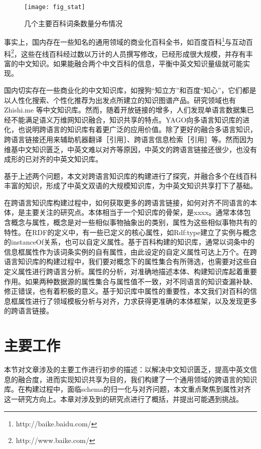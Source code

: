 \begin{figure}[H] %
  \centering
  \texttt{[image: fig\_stat]}
  \caption{几个主要百科词条数量分布情况}
  \label{fig:wiki-stat}
\end{figure}

事实上，国内存在一些知名的通用领域的商业化百科全书，如百度百科\footnote{http://baike.baidu.com/}与互动百科\footnote{http://www.baike.com/}，这些在线百科经过数以万计的人员撰写修改，已经形成很大规模，并存有丰富的中文知识。如果能融合两个中文百科的信息，平衡中英文知识量级就可能实现。

国内切实存在一些商业化的中文知识库，如搜狗“知立方”和百度“知心”，它们都是以人性化搜索、个性化推荐为出发点所建立的知识图谱产品。研究领域也有Zhishi.me\cite{niu2011zhishi} 等中文知识库。然而，随着开放链接的增多，人们发现单语言数据集已经不能满足语义万维网知识融合，知识共享的特点。YAGO向多语言知识库的进化，也说明跨语言的知识库有着更广泛的应用价值。除了更好的融合多语言知识，跨语言链接还用来辅助机器翻译［引用］、跨语言信息检索［引用］等。然而因为维基中文知识匮乏，中英文难以对齐等原因，中英文的跨语言链接还很少，也没有成形的已对齐的中英文知识库。

基于上述两个问题，本文对跨语言知识库的构建进行了探究，并融合多个在线百科丰富的知识，形成了中英文双语的大规模知识库，为中英文知识共享打下了基础。

在跨语言知识库构建过程中，如何获取更多的跨语言链接，如何对齐不同语言的本体，是主要关注的研究点。本体相当于一个知识库的骨架，是xxxx。通常本体包含概念与属性，概念是对一些相似事物抽象出的类别，属性为这些相似事物共有的特性。在RDF的定义中，有一些已定义的核心属性，如Rdf:type建立了实例与概念的instanceOf关系，也可以自定义属性。基于百科构建的知识库，通常以词条中的信息框属性作为该词条实例的自有属性，由此设定的自定义属性可达上万个。在跨语言知识库的构建过程中，我们要对概念下的属性集合有所筛选，也需要对这些自定义属性进行跨语言分析。属性的分析，对准确地描述本体、构建知识库起着重要作用。如果两种数据源的属性集合与属性值不一致，对不同语言的知识查漏补缺、修正错误，也有着积极的意义。基于知识库中属性的重要性，本文我们对百科的信息框属性进行了领域模板分析与对齐，力求获得更准确的本体框架，以及发现更多的跨语言链接。


\section{主要工作}
本节对文章涉及的主要工作进行初步的描述：以解决中文知识匮乏，提高中英文信息的融合度，进而实现知识共享为目的，我们构建了一个通用领域的跨语言的知识库。在构建过程中，面临schema的归一化与对齐问题，本文重点聚焦到属性对齐这一研究方向上。本章对涉及到的研究点进行了概括，并提出可能遇到挑战。

